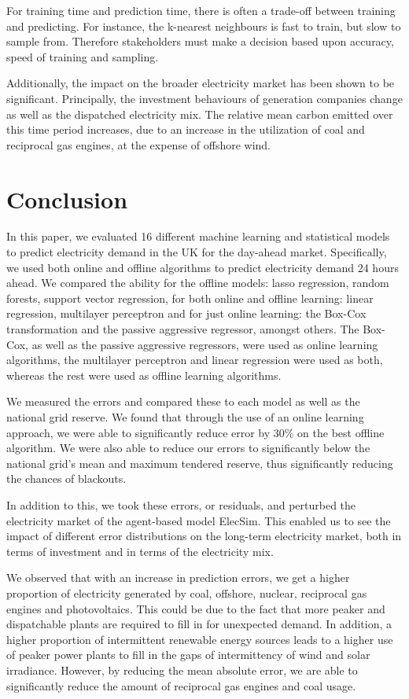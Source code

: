 For training time and prediction time, there is often a trade-off between training and predicting. For instance, the k-nearest neighbours is fast to train, but slow to sample from. Therefore stakeholders must make a decision based upon accuracy, speed of training and sampling. 

Additionally, the impact on the broader electricity market has been shown to be significant. Principally, the investment behaviours of generation companies change as well as the dispatched electricity mix. The relative mean carbon emitted over this time period increases, due to an increase in the utilization of coal and reciprocal gas engines, at the expense of offshore wind.


\section{Conclusion}
\label{sec:conclusion}

In this paper, we evaluated 16 different machine learning and statistical models to predict electricity demand in the UK for the day-ahead market. Specifically, we used both online and offline algorithms to predict electricity demand 24 hours ahead. We compared the ability for the offline models: lasso regression, random forests, support vector regression, for both online and offline learning: linear regression, multilayer perceptron and for just online learning: the Box-Cox transformation and the passive aggressive regressor, amongst others. The Box-Cox, as well as the passive aggressive regressors, were used as online learning algorithms, the multilayer perceptron and linear regression were used as both, whereas the rest were used as offline learning algorithms.

We measured the errors and compared these to each model as well as the national grid reserve. We found that through the use of an online learning approach, we were able to significantly reduce error by 30\% on the best offline algorithm.  We were also able to reduce our errors to significantly below the national grid's mean and maximum tendered reserve, thus significantly reducing the chances of blackouts.

In addition to this, we took these errors, or residuals, and perturbed the electricity market of the agent-based model ElecSim. This enabled us to see the impact of different error distributions on the long-term electricity market, both in terms of investment and in terms of the electricity mix.

We observed that with an increase in prediction errors, we get a higher proportion of electricity generated by coal, offshore, nuclear, reciprocal gas engines and photovoltaics. This could be due to the fact that more peaker and dispatchable plants are required to fill in for unexpected demand. In addition, a higher proportion of intermittent renewable energy sources leads to a higher use of peaker power plants to fill in the gaps of intermittency of wind and solar irradiance. However, by reducing the mean absolute error, we are able to significantly reduce the amount of reciprocal gas engines and coal usage.


